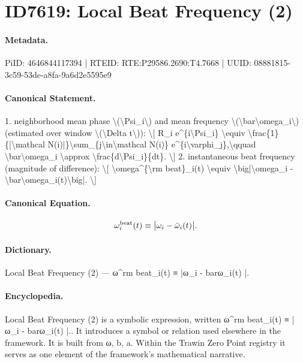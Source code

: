 \section*{ID7619: Local Beat Frequency (2)}
\paragraph{Metadata.}
PiID: 4646844117394 | RTEID: RTE:P29586.2690:T4.7668 | UUID: 08881815-3c59-53de-a8fa-9a6d2e5595e9

\paragraph{Canonical Statement.}
1. neighborhood mean phase \textbackslash{}(\textbackslash{}Psi\_i\textbackslash{}) and mean frequency \textbackslash{}(\textbackslash{}bar\textbackslash{}omega\_i\textbackslash{}) (estimated over window \textbackslash{}(\textbackslash{}Delta t\textbackslash{})): \textbackslash{}[ R\_i e\textasciicircum{}\{i\textbackslash{}Psi\_i\} \textbackslash{}equiv \textbackslash{}frac\{1\}\{|\textbackslash{}mathcal N(i)|\}\textbackslash{}sum\_\{j\textbackslash{}in\textbackslash{}mathcal N(i)\} e\textasciicircum{}\{i\textbackslash{}varphi\_j\},\textbackslash{}qquad \textbackslash{}bar\textbackslash{}omega\_i \textbackslash{}approx \textbackslash{}frac\{d\textbackslash{}Psi\_i\}\{dt\}. \textbackslash{}] 2. instantaneous beat frequency (magnitude of difference): \textbackslash{}[ \textbackslash{}omega\textasciicircum{}\{\textbackslash{}rm beat\}\_i(t) \textbackslash{}equiv \textbackslash{}big|\textbackslash{}omega\_i - \textbackslash{}bar\textbackslash{}omega\_i(t)\textbackslash{}big|. \textbackslash{}]

\paragraph{Canonical Equation.}
\[
\omega^{\rm beat}_i(t) \equiv \big|\omega_i - \bar\omega_i(t)\big|.
\]

\paragraph{Dictionary.}
Local Beat Frequency (2) — ω\textasciicircum{}rm beat\_i(t) ≡ |ω\_i - barω\_i(t) |.

\paragraph{Encyclopedia.}
Local Beat Frequency (2) is a symbolic expression, written ω\textasciicircum{}rm beat\_i(t) ≡ |ω\_i - barω\_i(t) |.. It introduces a symbol or relation used elsewhere in the framework. It is built from ω, b, a. Within the Trawin Zero Point registry it serves as one element of the framework's mathematical narrative.

